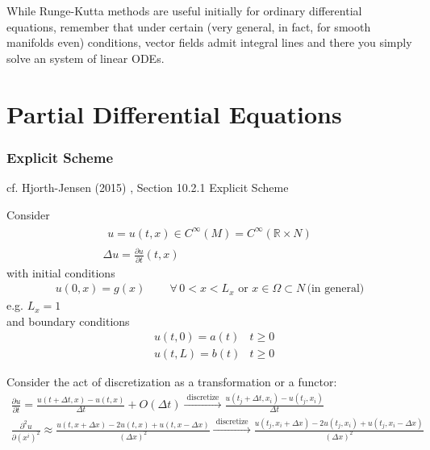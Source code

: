 \documentclass[10pt]{amsart}
\begin{document}
\begin{multicols*}{2}
While Runge-Kutta methods are useful initially for ordinary differential equations, remember that under certain (very general, in fact, for smooth manifolds even) conditions, vector fields admit integral lines and there you simply solve an system of linear ODEs.  


\section{Partial Differential Equations}

\subsubsection{Explicit Scheme}
cf. Hjorth-Jensen (2015) \cite{Hjor2015}, Section 10.2.1 Explicit Scheme

Consider
\begin{equation}
\begin{gathered}
  \begin{gathered}
    u = u(t,x) \in C^{\infty}(M) = C^{\infty}(\mathbb{R}\times N)  
  \end{gathered} \\
      \Delta u = \frac{ \partial u}{ \partial t}(t,x)
  \end{gathered}
  \end{equation}
with initial conditions
\[
  \begin{gathered}
    u(0,x)=g(x) \qquad \, \forall \, 0 < x < L_x \text{ or } x \in \Omega \subset N \, \text{(in general)}
    \end{gathered}
  \]
  e.g. $L_x=1$ \\

  and boundary conditions
  \[
\begin{aligned}
  & u(t,0) = a(t) & t \geq 0 \\ 
  & u(t,L) = b(t) & t \geq 0 
\end{aligned}
  \]

  Consider the act of discretization as a transformation or a functor:
  \begin{equation}
\begin{gathered}
  \frac{ \partial u}{ \partial t} = \frac{ u(t+\Delta t,x) - u(t,x) }{ \Delta t} + O(\Delta t) \xrightarrow{ \text{ discretize } } \frac{ u(t_j + \Delta t, x_i) - u(t_j,x_i) }{ \Delta t } \\
  \frac{ \partial^2 u}{ \partial (x^i)^2 } \approx \frac{ u(t,x + \Delta x) - 2 u(t,x) + u(t, x-\Delta x) }{ (\Delta x)^2 }  \xrightarrow{ \text{ discretize } } \frac{ u(t_j  , x_i+\Delta x) - 2 u(t_j,x_i) + u(t_j,x_i-\Delta x) }{ ( \Delta x)^2 } 
\end{gathered}
  \end{equation}


\end{multicols*}
\end{document}
